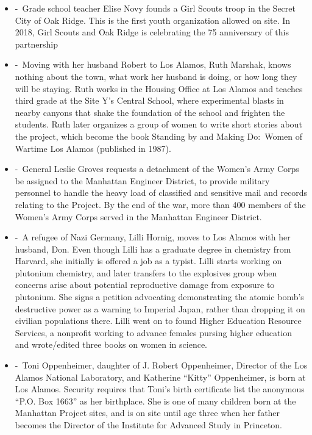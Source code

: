 \documentclass[12pt,a4paper]{article}
\begin{document}
\begin{enumerate}
\begin{itemize}
      \item[]  -\ Grade school teacher Elise Novy founds a Girl Scouts troop in the Secret City of Oak Ridge. This is the first youth organization allowed on site. In 2018, Girl Scouts and Oak Ridge is celebrating the 75 anniversary of this partnership
      \item[]  -\ Moving with her husband Robert to Los Alamos, Ruth Marshak, knows nothing about the town, what work her husband is doing, or how long they will be staying. Ruth works in the Housing Office at Los Alamos and teaches third grade at the Site Y's Central School, where experimental blasts in nearby canyons that shake the foundation of the school and frighten the students. Ruth later organizes a group of women to write short stories about the project, which become the book Standing by and Making Do:\ Women of Wartime Los Alamos (published in 1987).
      \item[]  -\ General Leslie Groves requests a detachment of the Women's Army Corps be assigned to the Manhattan Engineer District, to provide military personnel to handle the heavy load of classified and sensitive mail and records relating to the Project. By the end of the war, more than 400 members of the Women's Army Corps served in the Manhattan Engineer District.
      \item[]  -\ A refugee of Nazi Germany, Lilli Hornig, moves to Los Alamos with her husband, Don. Even though Lilli has a graduate degree in chemistry from Harvard, she initially is offered a job as a typist. Lilli starts working on plutonium chemistry, and later transfers to the explosives group when concerns arise about potential reproductive damage from exposure to plutonium. She signs a petition advocating demonstrating the atomic bomb's destructive power as a warning to Imperial Japan, rather than dropping it on civilian populations there. Lilli went on to found Higher Education Resource Services, a nonprofit working to advance females pursing higher education and wrote/edited three books on women in science.
      \item[]  -\ Toni Oppenheimer, daughter of J. Robert Oppenheimer, Director of the Los Alamos National Laboratory, and Katherine ``Kitty'' Oppenheimer, is born at Los Alamos. Security requires that Toni's birth certificate list the anonymous ``P.O. Box 1663'' as her birthplace. She is one of many children born at the Manhattan Project sites, and is on site until age three when her father becomes the Director of the Institute for Advanced Study in Princeton.

\end{itemize}
\end{enumerate}
\end{document}
